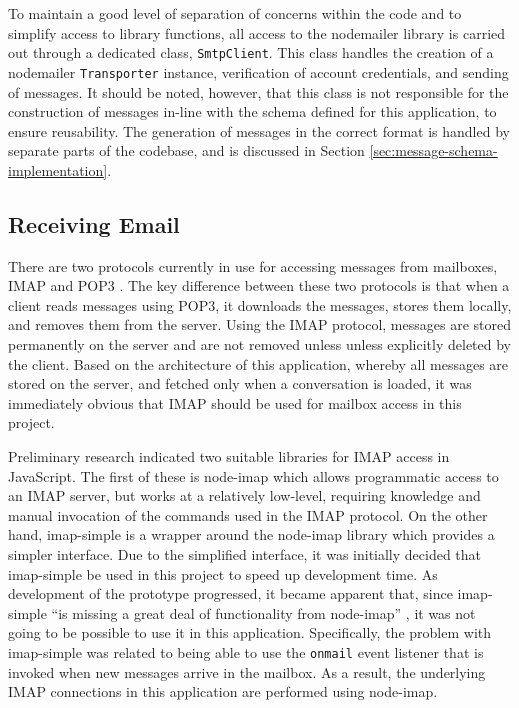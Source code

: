 To maintain a good level of separation of concerns within the code and to simplify access to library functions, all access to the nodemailer library is carried out through a dedicated class, \verb|SmtpClient|. This class handles the creation of a nodemailer \verb|Transporter| instance, verification of account credentials, and sending of messages. It should be noted, however, that this class is not responsible for the construction of messages in-line with the schema defined for this application, to ensure reusability. The generation of messages in the correct format is handled by separate parts of the codebase, and is discussed in Section \ref{sec:message-schema-implementation}.

\subsection{Receiving Email}
There are two protocols currently in use for accessing messages from mailboxes, IMAP \cite{imap-rfc} and POP3 \cite{pop-rfc}. The key difference between these two protocols is that when a client reads messages using POP3, it downloads the messages, stores them locally, and removes them from the server. Using the IMAP protocol, messages are stored permanently on the server and are not removed unless unless explicitly deleted by the client. Based on the architecture of this application, whereby all messages are stored on the server, and fetched only when a conversation is loaded, it was immediately obvious that IMAP should be used for mailbox access in this project.

Preliminary research indicated two suitable libraries for IMAP access in JavaScript. The first of these is node-imap \cite{node-imap} which allows programmatic access to an IMAP server, but works at a relatively low-level, requiring knowledge and manual invocation of the commands used in the IMAP protocol. On the other hand, imap-simple \cite{imap-simple} is a wrapper around the node-imap library which provides a simpler interface. Due to the simplified interface, it was initially decided that imap-simple be used in this project to speed up development time. As development of the prototype progressed, it became apparent that, since imap-simple ``is missing a great deal of functionality from node-imap'' \cite{imap-simple}, it was not going to be possible to use it in this application. Specifically, the problem with imap-simple was related to being able to use the \texttt{onmail} event listener that is invoked when new messages arrive in the mailbox. As a result, the underlying IMAP connections in this application are performed using node-imap.

